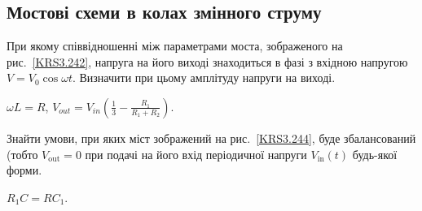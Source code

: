 \subsection*{Мостові схеми в колах змінного струму}
\begin{problem}\label{prb:KRS3.242}
При якому співвідношенні між параметрами моста, зображеного на рис.~\ref{KRS3.242}, напруга на його виході знаходиться в фазі з вхідною напругою $V = V_0\cos\omega t$. Визначити при цьому амплітуду напруги на виході.
\begin{solution}
	$\omega L = R$, $V_{out} = V_{in} \left( \frac13 - \frac{R_1}{R_1 + R_2}\right) $.
\end{solution}
\end{problem}

\begin{problem}\label{prb:KRS3.244}
Знайти умови,  при яких міст зображений на рис.~\ref{KRS3.244}, буде збалансований (тобто $V_{\mathrm{out}} = 0$ при подачі на його
вхід періодичної напруги $V_{\mathrm{in}}(t)$ будь-якої форми.
\begin{solution}
	$R_1C = RC_1$.
\end{solution}
\end{problem}


